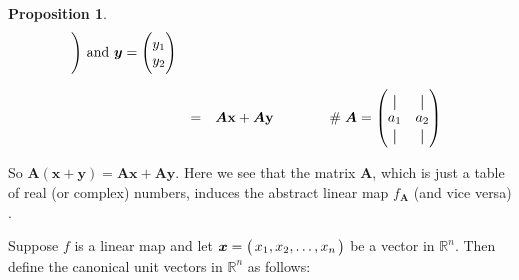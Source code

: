 \documentclass{article}
\theoremstyle{definition}
\newtheorem{proposition}{Proposition}[section]
\newcommand*{\vertbar}{\rule[-1ex]{0.5pt}{2.5ex}}
\begin{document}
\begin{proposition}
\begin{equation*}
\begin{array}{llll}
\begin{array}{cccc}
																							\end{array}
																							\hspace{-0.50em}
																							\Bigg )
																							\text{ and } 
																							\bm{y} = \Bigg (
																							\hspace{-0.50em}
																							\begin{array}{cccc}
																								y_1 \\
																								y_2
																							\end{array}
																							\hspace{-0.50em}
																							\Bigg ) \\
[20pt]
&=&
\bm{A}\mathbf{x} + \bm{A}\mathbf{y}						&\hspace{3.00em}\mathrel{\#} \bm{A} = \left (
																							\hspace{-0.50em}
																							\begin{array}{cccc}
																								\vertbar & \vertbar \\
																								a_{1}    & a_{2}    \\
																								\vertbar & \vertbar 
																							\end{array}
																							\hspace{-0.50em}
																							\right ) \\
\end{array}
\end{equation*}

\bigskip
\noindent
So $\bm{A}(\mathbf{x}+\mathbf{y}) =
\bm{A}\mathbf{x}+\bm{A}\mathbf{y}$. Here we see that the matrix
$\bm{A}$, which is just a table of real (or complex) numbers,
induces the abstract linear map $f_{\bm{A}}$ (and vice versa)
\cite{wiki:linear_map}.
\end{proposition}

\bigskip
\noindent
Suppose $f$ is a linear map and let $\bm{x} = \left
( \hspace{-0.35em} \begin{array}{cccc} x_1, x_2,\hdots,
x_n \end{array} \hspace{-0.35em} \right)$ be a vector in
$\mathbb{R}^{n}$. Then define the canonical unit vectors in
$\mathbb{R}^{n}$ as follows:
\end{document}
